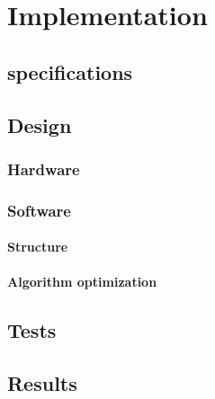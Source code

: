 \chapter{Implementation}
\label{chp:Implementation}

\section{specifications}
\label{sec:specifications}

\section{Design}
\label{sec:Design}

\subsection{Hardware}
\label{sec:Hardware}
\subsection{Software}
\label{sec:Software}

\subsubsection{Structure}

\subsubsection{Algorithm optimization}

\section{Tests}
\label{sec:Tests}

\section{Results}
\label{sec:Results}